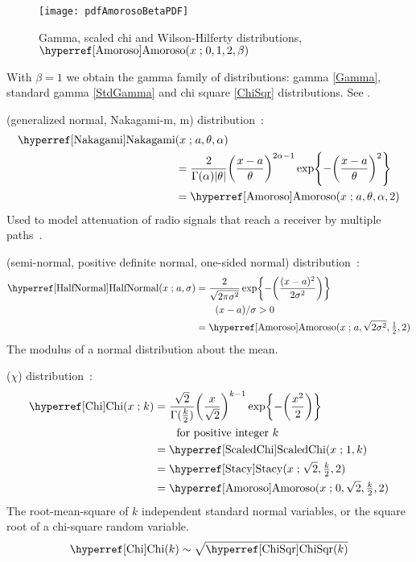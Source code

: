 
\begin{figure}[t]
\begin{center}
\texttt{[image: pdfAmorosoBetaPDF]}
\end{center}
\caption[Gamma, scaled chi and Wilson-Hilferty distributions]{Gamma, scaled chi and Wilson-Hilferty distributions, $\opr{Amoroso}(x\given 0,1,2,\beta)$}
\end{figure}

With $\beta=1$ we obtain the gamma family of distributions: gamma \eqref{Gamma}, standard gamma \eqref{StdGamma} and chi square \eqref{ChiSqr} distributions. See .



 (generalized normal, Nakagami-m, m) distribution~\cite{Nakagami1960}:
\begin{align}
\label{Nakagami}
 \opr{Nakagami}&(x \given a , \theta, \alpha) 
\\ \notag 
& =
 \frac{2}{\Gamma(\alpha) |\theta| }
\Left(\frac{x-a }{\theta}\Right)^{2\alpha -1}
\exp \Left\{
-  \Left(\frac{x-a }{\theta}\Right)^{2}
\Right\}
\checked
\\ \notag
& = \opr{Amoroso}(x\given a,\theta, \alpha ,2) \checked
\notag
\end{align}
Used to model attenuation of radio signals that reach a receiver by multiple paths~\cite{Nakagami1960}.




 (semi-normal, positive definite normal, one-sided normal) distribution~\cite{Johnson1994}:
%
\begin{align}
\label{HalfNormal}
\opr{HalfNormal}(x \given a, \sigma ) 
&= \frac{2}{\sqrt{2\pi \sigma^2}} 
\exp\Left\{-\Left( \frac{(x-a)^2}{2\sigma^2}\Right) \Right\}  
\checked
\\
& \qquad (x-a)/\sigma>0 \notag \\
&=  \opr{Amoroso}(x\given  a, \sqrt{2\sigma^2} , \tfrac{1}{2}, 2) \notag  \checked
\end{align}
The modulus of a normal distribution about the mean.

 ($\chi$) distribution~\cite{Johnson1994}:
%
\begin{align}
\label{Chi}
\opr{Chi}(x \given k) 
&= \frac{ \sqrt{2}}{\Gamma(\tfrac{k}{2})} { \Left(\frac{x}{\sqrt{2}}\Right)}^{k-1} 
\exp\Left\{ -\Left( \frac{x^2}{2}    \Right)\Right\} \checked
\\
& \qquad \text{for positive integer } k \notag \\
& = \opr{ScaledChi}(x\given 1,k) \notag \checked \\
&=  \opr{Stacy}(x\given \sqrt{2}, \sfrac{k}{2}, 2)  \notag \checked \\
&=  \opr{Amoroso}(x\given  0, \sqrt{2} , \sfrac{k}{2}, 2) \notag \checked
\end{align}
The root-mean-square of $k$ independent standard normal variables, or the square root of a chi-square random variable.
\[
\opr{Chi}(k) \sim \sqrt{\opr{ChiSqr}(k)} \checked
\notag
\]

